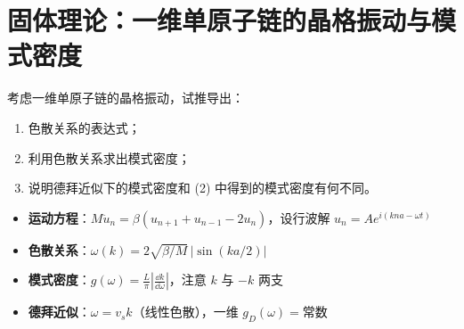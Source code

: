 \section{固体理论：一维单原子链的晶格振动与模式密度}
\label{sec:1d-phonon}

\begin{modelbox}
考虑一维单原子链的晶格振动，试推导出：
\begin{enumerate}
    \item 色散关系的表达式；
    \item 利用色散关系求出模式密度；
    \item 说明德拜近似下的模式密度和 (2) 中得到的模式密度有何不同。
\end{enumerate}
\end{modelbox}

\begin{tipbox}[考点快速分析]
\begin{itemize}
    \item \textbf{运动方程}：$M\ddot{u}_n=\beta(u_{n+1}+u_{n-1}-2u_n)$，设行波解 $u_n=Ae^{i(kna-\omega t)}$
    \item \textbf{色散关系}：$\omega(k)=2\sqrt{\beta/M}\,|\sin(ka/2)|$
    \item \textbf{模式密度}：$g(\omega)=\frac{L}{\pi}|\frac{\dd k}{\dd\omega}|$，注意 $k$ 与 $-k$ 两支
    \item \textbf{德拜近似}：$\omega=v_s k$（线性色散），一维 $g_D(\omega)=\text{常数}$
\end{itemize}
\end{tipbox}

